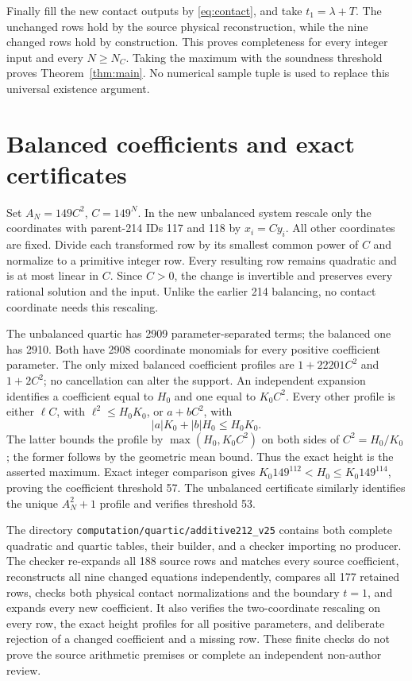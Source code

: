 \documentclass[11pt,a4paper]{article}
\begin{document}
Finally fill the new contact outputs by \eqref{eq:contact}, and take
$t_1=\lambda+T$. The unchanged rows hold by the source physical
reconstruction, while the nine changed rows hold by construction.
This proves completeness for every integer input and every
$N\ge N_C$. Taking the maximum with the soundness threshold proves
Theorem~\ref{thm:main}. No numerical sample tuple is used to replace
this universal existence argument.

\section{Balanced coefficients and exact certificates}
Set $A_N=149C^2$, $C=149^N$. In the new unbalanced system rescale
only the coordinates with parent-214 IDs 117 and 118 by
$x_i=C y_i$. All other coordinates are fixed. Divide each transformed
row by its smallest common power of $C$ and normalize to a primitive
integer row. Every resulting row remains quadratic and is at most
linear in $C$. Since $C>0$, the change is invertible and preserves
every rational solution and the input. Unlike the earlier 214
balancing, no contact coordinate needs this rescaling.

The unbalanced quartic has 2909 parameter-separated terms; the
balanced one has 2910. Both have 2908 coordinate monomials for every
positive coefficient parameter. The only mixed balanced coefficient
profiles are $1+22201C^2$ and $1+2C^2$; no cancellation can alter
the support. An independent expansion identifies a coefficient equal
to $H_0$ and one equal to $K_0C^2$. Every other profile is either
$\ell C$, with $\ell^2\le H_0K_0$, or $a+bC^2$, with
\[
                     |a|K_0+|b|H_0\le H_0K_0.
\]
The latter bounds the profile by $\max(H_0,K_0C^2)$ on both sides
of $C^2=H_0/K_0$; the former follows by the geometric mean bound.
Thus the exact height is the asserted maximum. Exact integer
comparison gives $K_0 149^{112}<H_0\le K_0 149^{114}$, proving the
coefficient threshold 57. The unbalanced certificate similarly
identifies the unique $A_N^2+1$ profile and verifies threshold 53.

The directory \texttt{computation/quartic/additive212\_v25} contains
both complete quadratic and quartic tables, their builder, and a
checker importing no producer. The checker re-expands all 188 source
rows and matches every source coefficient, reconstructs all nine
changed equations independently, compares all 177 retained rows,
checks both physical contact normalizations and the boundary $t=1$,
and expands every new coefficient. It also verifies the two-coordinate
rescaling on every row, the exact height profiles for all positive
parameters, and deliberate rejection of a changed coefficient and a
missing row. These finite checks do not prove the source arithmetic
premises or complete an independent non-author review.
\end{document}
